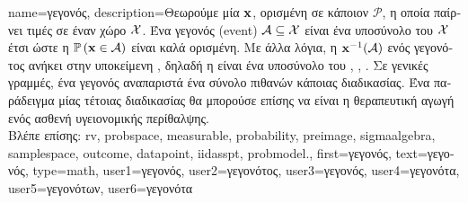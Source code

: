 {name={\foreignlanguage{greek}{γεγονός}}, 
	description={\foreignlanguage{greek}{Θεωρούμε μία}  ${\bf x}$, 
		\foreignlanguage{greek}{ορισμένη σε κάποιον}  $\mathcal{P}$, \foreignlanguage{greek}{η οποία 
		παίρνει τιμές σε έναν}  \foreignlanguage{greek}{χώρο $\mathcal{X}$. 
		Ένα γεγονός} (event) $\mathcal{A} \subseteq \mathcal{X}$ \foreignlanguage{greek}{είναι ένα υποσύνολο του $\mathcal{X}$ 
		έτσι ώστε η}  $\mathbb{P}\left({\bf x} \in \mathcal{A}\right)$ \foreignlanguage{greek}{είναι καλά ορισμένη. 
		Με άλλα λόγια, η}  ${\bf x}^{-1}(\mathcal{A})$ 
		\foreignlanguage{greek}{ενός γεγονότος ανήκει στην υποκείμενη} , 
		\foreignlanguage{greek}{δηλαδή η}  \foreignlanguage{greek}{είναι ένα}  
		\foreignlanguage{greek}{υποσύνολο του}  
		\cite{RudinBook}, \cite{BillingsleyProbMeasure}, \cite{durrett2010probability}.	
		\foreignlanguage{greek}{Σε γενικές γραμμές, ένα γεγονός αναπαριστά ένα σύνολο πιθανών}  
		\foreignlanguage{greek}{κάποιας διαδικασίας. Ένα παράδειγμα μίας τέτοιας διαδικασίας θα μπορούσε επίσης να είναι 
		η θεραπευτική αγωγή ενός ασθενή υγειονομικής περίθαλψης.}
		\\
		\foreignlanguage{greek}{Βλέπε επίσης:} \gls{rv}, \gls{probspace}, \gls{measurable}, \gls{probability}, 
		\gls{preimage}, \gls{sigmaalgebra}, \gls{samplespace}, \gls{outcome}, \gls{datapoint}, \gls{iidasspt}, \gls{probmodel}.},
	first={\foreignlanguage{greek}{γεγονός}},
	text={\foreignlanguage{greek}{γεγονός}},
	type=math,
	user1={\foreignlanguage{greek}{γεγονός}}, %
  	user2={\foreignlanguage{greek}{γεγονότος}}, %
	user3={\foreignlanguage{greek}{γεγονός}}, %
	user4={\foreignlanguage{greek}{γεγονότα}}, %
  	user5={\foreignlanguage{greek}{γεγονότων}}, %
	user6={\foreignlanguage{greek}{γεγονότα}} %
}

